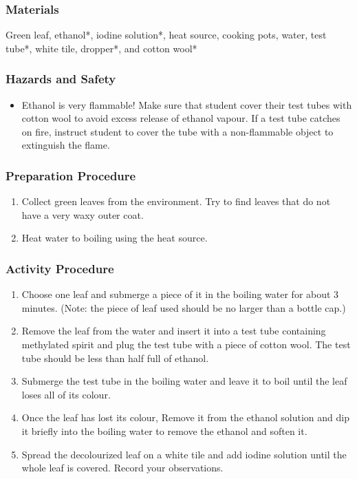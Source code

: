 \subsubsection*{Materials}
Green leaf, ethanol*, iodine solution*, heat source, cooking pots, water, test tube*, white tile, dropper*, and cotton wool*

\subsubsection*{Hazards and Safety}
\begin{itemize}
\item{Ethanol is very flammable! Make sure that student cover their test tubes with cotton wool to avoid excess release of ethanol vapour. If a test tube catches on fire, instruct student to cover the tube with a non-flammable object to extinguish the flame.}
\end{itemize}

\subsubsection*{Preparation Procedure}
\begin{enumerate}
\item{Collect green leaves from the environment. Try to find leaves that do not have a very waxy outer coat.}
\item{Heat water to boiling using the heat source.}
\end{enumerate}

\subsubsection*{Activity Procedure}
\begin{enumerate}
\item{Choose one leaf and submerge a piece of it in the boiling water for about 3 minutes. (Note: the piece of leaf used should be no larger than a bottle cap.)}
\item{Remove the leaf from the water and insert it into a test tube containing methylated spirit and plug the test tube with a piece of cotton wool. The test tube should be less than half full of ethanol.}
\item{Submerge the test tube in the boiling water and leave it to boil until the leaf loses all of its colour.}
\item{Once the leaf has lost its colour, Remove it from the ethanol solution and dip it briefly into the boiling water to remove the ethanol and soften it.}
\item{Spread the decolourized leaf on a white tile and add iodine solution until the whole leaf is covered. Record your observations.}
\end{enumerate}

